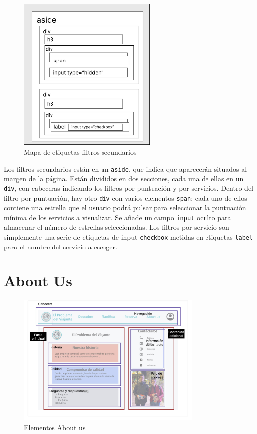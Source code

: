 \documentclass[11pt, a4paper]{book}
\begin{document}
	\begin{figure} [H]
		\centering
		\includegraphics[width=0.6\textwidth]{HTML/Etiq-filtros-secundarios.jpg}
		\caption{Mapa de etiquetas filtros secundarios}
	\end{figure}

    Los filtros secundarios están en un \texttt{aside}, que indica que aparecerán situados al margen de la página. Están divididos en dos secciones, cada una de ellas en un \texttt{div}, con cabeceras indicando los filtros por puntuación y por servicios. Dentro del filtro por puntuación, hay otro \texttt{div} con varios elementos \texttt{span}; cada uno de ellos contiene una estrella que el usuario podrá pulsar para seleccionar la puntuación mínima de los servicios a visualizar. Se añade un campo \texttt{input} oculto para almacenar el número de estrellas seleccionadas. Los filtros por servicio son simplemente una serie de etiquetas de input \texttt{checkbox} metidas en etiquetas \texttt{label} para el nombre del servicio a escoger.

    \section{About Us}
	\begin{figure} [H]
		\centering
		\includegraphics[width=0.8\textwidth]{HTML/Doc-about_us.jpg}
		\caption{Elementos About us}
	\end{figure}
\end{document}
